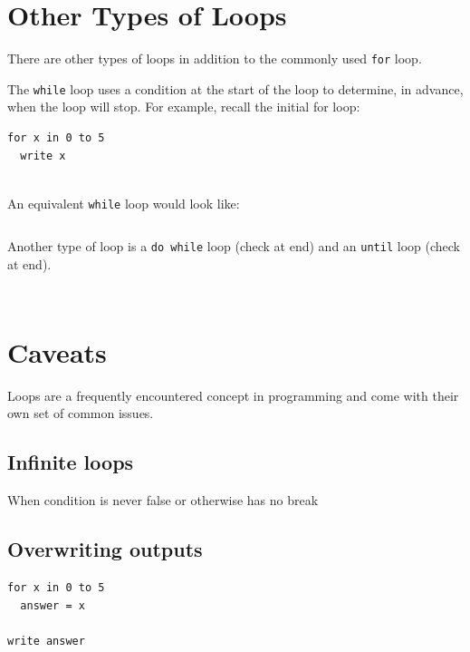 \documentclass[
]{book}
\begin{document}
\section{Other Types of Loops}\label{other-types-of-loops}

There are other types of loops in addition to the commonly used \texttt{for} loop.~

The \texttt{while} loop uses a condition at the start of the loop to determine, in advance, when the loop will stop. For example, recall the initial for loop:

\begin{verbatim}
for x in 0 to 5 
  write x
  
\end{verbatim}

An equivalent \texttt{while} loop would look like:

\begin{verbatim}

\end{verbatim}

Another type of loop is a \texttt{do\ while} loop (check at end) and an \texttt{until} loop (check at end).

\begin{verbatim}
\end{verbatim}

\begin{verbatim}
\end{verbatim}

\section{Caveats}\label{caveats}

Loops are a frequently encountered concept in programming and come with their own set of common issues.

\subsection{Infinite loops}\label{infinite-loops}

When condition is never false or otherwise has no break

\subsection{Overwriting outputs}\label{overwriting-outputs}

\begin{verbatim}
for x in 0 to 5 
  answer = x

write answer
  
\end{verbatim}
\end{document}
